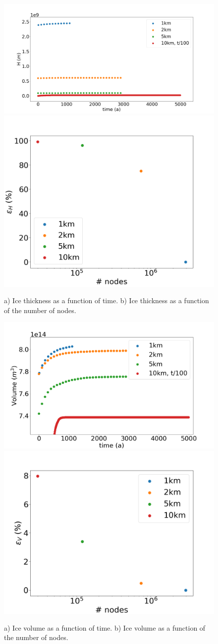 \documentclass{article}
\begin{document}
	\begin{figure}[!h]
	\centering
	\includegraphics[width=0.45\linewidth]{../fig/H_CONE_full_all_res_vs_time.png}
	\includegraphics[width=0.45\linewidth]{../fig/H_CONE_full_all_res_vs_num_nodes.png}
	\caption{a) Ice thickness as a function of time. b) Ice thickness as a function of the number of nodes.}
	\label{H_CONE_all_res}
	\end{figure}

	\begin{figure}[!h]
	\centering
	\includegraphics[width=0.45\linewidth]{../fig/Volume_CONE_full_all_res_vs_time.png}
	\includegraphics[width=0.45\linewidth]{../fig/Volume_CONE_full_all_res_vs_num_nodes.png}
	\caption{a) Ice volume as a function of time. b) Ice volume as a function of the number of nodes.}
	\label{Volume_CONE_all_res}
\end{figure}
\end{document}
